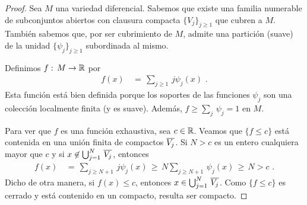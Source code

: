 \begin{proof}
	Sea $M$ una variedad diferencial. Sabemos que existe una familia
	numerable de subconjuntos abiertos con clausura compacta
	$\{V_{j}\}_{j\geq 1}$ que cubren a $M$. Tambi\'{e}n sabemos que,
	por ser cubrimiento de $M$, admite una partici\'{o}n (suave) de la
	unidad $\{\psi_{j}\}_{j\geq 1}$ subordinada al mismo.

	Definimos $f:\,M\rightarrow\mathbb{R}$ por
	\begin{align*}
		f(x) & \,=\,\sum_{j\geq 1}\,j\psi_{j}(x)
		\text{ .}
	\end{align*}
	Esta funci\'{o}n est\'{a} bien definida porque los soportes de
	las funciones $\psi_{j}$ son una colecci\'{o}n localmente finita
	(y es suave). Adem\'{a}s, $f\geq\sum_{j}\,\psi_{j}=1$ en $M$.

	Para ver que $f$ es una funci\'{o}n exhaustiva, sea $c\in\mathbb{R}$.
	Veamos que $\{f\leq c\}$ est\'{a} contenida en una uni\'{o}n finita
	de compactos $\overline{V_{j}}$. Si $N>c$ es un entero cualquiera
	mayor que $c$ y si $x\not\in\bigcup_{j=1}^{N}\,\overline{V_{j}}$, entonces
	\begin{align*}
		f(x) & \,=\,\sum_{j\geq N+1}\,j\psi_{j}(x) \,\geq\,
			N\sum_{j\geq N+1}\,\psi_{j}(x) \,\geq\,N>c
		\text{ .}
	\end{align*}
	Dicho de otra manera, si $f(x)\leq c$, entonces
	$x\in\bigcup_{j=1}^{N}\,\overline{V_{j}}$. Como $\{f\leq c\}$ es cerrado
	y est\'{a} contenido en un compacto, resulta ser compacto.
\end{proof}
